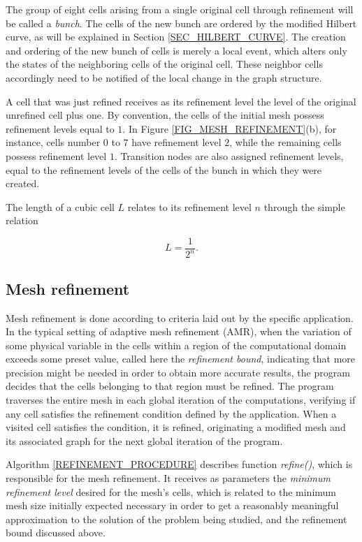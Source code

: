 The group of eight cells arising from a single original cell through
refinement will be called a \textit{bunch}. The cells of the new
bunch are ordered by the modified Hilbert curve, as will be
explained in Section \ref{SEC_HILBERT_CURVE}. The creation and
ordering of the new bunch of cells is merely a local event, which
alters only the states of the neighboring cells of the original
cell. These neighbor cells accordingly need to be notified of the
local change in the graph structure.

A cell that was just refined receives as its refinement level the level of the original unrefined cell plus one.
By convention, the cells of the initial mesh possess refinement
levels equal to $1$. In Figure \ref{FIG_MESH_REFINEMENT}(b), for
instance, cells number $0$ to $7$ have refinement level $2$, while
the remaining cells possess refinement level $1$. Transition nodes
are also assigned refinement levels, equal to the refinement levels
of the cells of the bunch in which they were created.

The length of a cubic cell $L$ relates to its refinement level $n$
through the simple relation

\begin{equation} \label{EQ_EDGE_SIZE}
 L = \frac{1}{2^n}.
\end{equation}

\subsection{Mesh refinement}
Mesh refinement is done according to criteria laid out by the
specific application. In the typical setting of adaptive mesh
refinement (AMR), when the variation of some physical variable in
the cells within a region of the computational domain exceeds some
preset value, called here the \textit{refinement bound}, indicating
that more precision might be needed in order to obtain more accurate
results, the program decides that the cells belonging to that region
must be refined. The program traverses the entire mesh in each
global iteration of the computations, verifying if any cell
satisfies the refinement condition defined by the application. When
a visited cell satisfies the condition, it is refined, originating a
modified mesh and its associated graph for the next global iteration
of the program.

Algorithm \ref{REFINEMENT_PROCEDURE} describes function
\textit{refine()}, which is responsible for the mesh refinement. It
receives as parameters the \textit{minimum refinement level} desired
for the mesh's cells, which is related to the minimum mesh size
initially expected necessary in order to get a reasonably meaningful
approximation to the solution of the problem being studied, and the
refinement bound discussed above.


